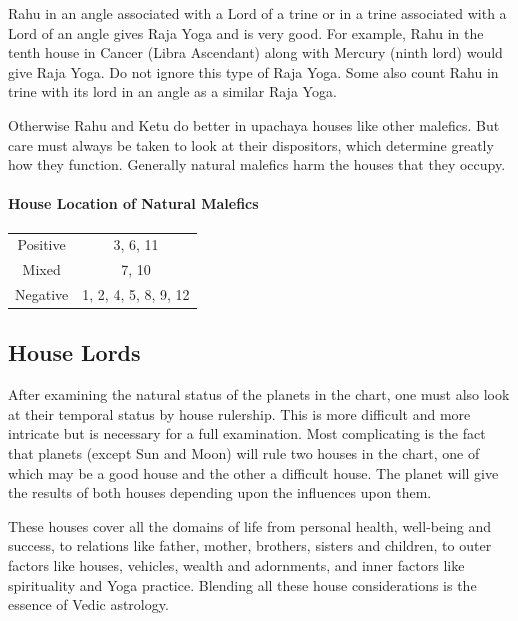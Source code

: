  

Rahu in an angle associated with a Lord of a trine or in a trine associated with a Lord of an angle gives Raja Yoga and is very good. For example, Rahu in the tenth house in Cancer (Libra Ascendant) along with Mercury (ninth lord) would give Raja Yoga. Do not ignore this type of Raja Yoga. Some also count Rahu in trine with its lord in an angle as a similar Raja Yoga.

 

Otherwise Rahu and Ketu do better in upachaya houses like other malefics. But care must always be taken to look at their dispositors, which determine greatly how they function. Generally natural malefics harm the houses that they occupy.

 

\paragraph{House Location of Natural Malefics}


 
\begin{center}
\begin{tabular}{ c c  }
Positive & 3, 6, 11 \\ 
Mixed & 7, 10 \\  
Negative & 1, 2, 4, 5, 8, 9, 12  
\end{tabular}
\end{center}
 

\subsection{House Lords }


After examining the natural status of the planets in the chart, one must also look at their temporal status by house rulership. This is more difficult and more intricate but is necessary for a full examination. Most complicating is the fact that planets (except Sun and Moon) will rule two houses in the chart, one of which may be a good house and the other a difficult house. The planet will give the results of both houses depending upon the influences upon them.

 

These houses cover all the domains of life from personal health, well-being and success, to relations like father, mother, brothers, sisters and children, to outer factors like houses, vehicles, wealth and adornments, and inner factors like spirituality and Yoga practice. Blending all these house considerations is the essence of Vedic astrology.

